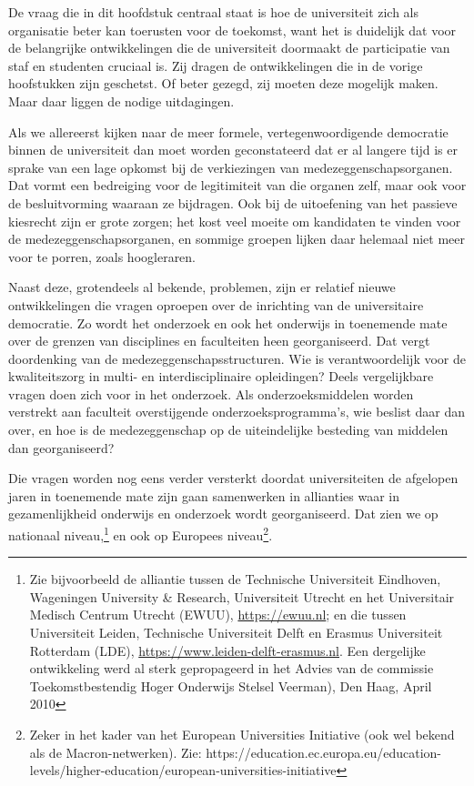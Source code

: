 \documentclass[empirical, authordate, ]{new-jote-article}
\begin{document}
	De vraag die in dit hoofdstuk centraal staat is hoe de universiteit zich als organisatie beter kan toerusten voor de toekomst, want het is duidelijk dat voor de belangrijke ontwikkelingen die de universiteit doormaakt de participatie van staf en studenten cruciaal is. Zij dragen de ontwikkelingen die in de vorige hoofstukken zijn geschetst. Of beter gezegd, zij moeten deze mogelijk maken. Maar daar liggen de nodige uitdagingen.



	Als we allereerst kijken naar de meer formele, vertegenwoordigende democratie binnen de universiteit dan moet worden geconstateerd dat er al langere tijd is er sprake van een lage opkomst bij de verkiezingen van medezeggenschapsorganen. Dat vormt een bedreiging voor de legitimiteit van die organen zelf, maar ook voor de besluitvorming waaraan ze bijdragen. Ook bij de uitoefening van het passieve kiesrecht zijn er grote zorgen; het kost veel moeite om kandidaten te vinden voor de medezeggenschapsorganen, en sommige groepen lijken daar helemaal niet meer voor te porren, zoals hoogleraren.



	Naast deze, grotendeels al bekende, problemen, zijn er relatief nieuwe ontwikkelingen die vragen oproepen over de inrichting van de universitaire democratie. Zo wordt het onderzoek en ook het onderwijs in toenemende mate over de grenzen van disciplines en faculteiten heen georganiseerd. Dat vergt doordenking van de medezeggenschapsstructuren. Wie is verantwoordelijk voor de kwaliteitszorg in multi- en interdisciplinaire opleidingen? Deels vergelijkbare vragen doen zich voor in het onderzoek. Als onderzoeksmiddelen worden verstrekt aan faculteit overstijgende onderzoeksprogramma's, wie beslist daar dan over, en hoe is de medezeggenschap op de uiteindelijke besteding van middelen dan georganiseerd?



	Die vragen worden nog eens verder versterkt doordat universiteiten de afgelopen jaren in toenemende mate zijn gaan samenwerken in allianties waar in gezamenlijkheid onderwijs en onderzoek wordt georganiseerd. Dat zien we op nationaal niveau,\footnote{Zie bijvoorbeeld de alliantie tussen de Technische Universiteit Eindhoven, Wageningen University \& Research, Universiteit Utrecht en het Universitair Medisch Centrum Utrecht (EWUU), \href{https://ewuu.nl}{https://ewuu.nl}; en die tussen Universiteit Leiden, Technische Universiteit Delft en Erasmus Universiteit Rotterdam (LDE), \href{https://www.leiden-delft-erasmus.nl}{https://www.leiden-delft-erasmus.nl}. Een dergelijke ontwikkeling werd al sterk gepropageerd in het Advies van de commissie Toekomstbestendig Hoger Onderwijs Stelsel Veerman), Den Haag, April 2010} en ook op Europees niveau\footnote{Zeker in het kader van het European Universities Initiative (ook wel bekend als de Macron-netwerken). Zie: https://education.ec.europa.eu/education-levels/higher-education/european-universities-initiative}.
\end{document}
